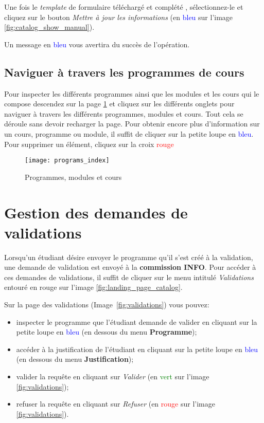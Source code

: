 Une fois le \textit{template} de formulaire téléchargé et complété , sélectionnez-le et cliquez sur le bouton \textit{Mettre à jour les informations} (en \textcolor{blue}{bleu} sur l'image \ref{fig:catalog_show_manual}).


Un message en \textcolor{blue}{bleu} vous avertira du succès de l'opération.


\subsection{Naviguer à travers les programmes de cours}

Pour inspecter les différents programmes ainsi que les modules et les cours qui le compose descendez sur la page \ref{fig:programs_index} et cliquez sur les différents onglets pour naviguer à travers les différents programmes, modules et cours. Tout cela se déroule sans devoir recharger la page. Pour obtenir encore plus d'information sur un cours, programme ou module, il suffit de cliquer sur la petite loupe en \textcolor{blue}{bleu}. Pour supprimer un élément, cliquez sur la croix \textcolor{red}{rouge}

\begin{figure}[htb]
\centering
\caption{Programmes, modules et cours}
\label{fig:programs_index}
\texttt{[image: programs\_index]}

\end{figure}



\section{Gestion des demandes de validations}
Lorsqu'un étudiant désire envoyer le programme qu'il s'est créé à la validation, une demande de validation est envoyé à la \textbf{commission INFO}. Pour accéder à ces demandes de validations, 
il suffit de cliquer sur le menu intitulé \textit{Validations} entouré en rouge sur l'image \ref{fig:landing_page_catalog}.

Sur la page des validations (Image~\ref{fig:validations}) vous pouvez:
\begin{itemize}
\item inspecter le programme que l'étudiant demande de valider en cliquant sur la petite loupe en \textcolor{blue}{bleu} (en dessous du menu \textbf{Programme});
\item accéder à la justification de l'étudiant en cliquant sur la petite loupe en \textcolor{blue}{bleu} (en dessous du menu \textbf{Justification});
\item valider la requête en cliquant sur \textit{Valider} (en \textcolor{green}{vert} sur l'image \ref{fig:validations});
\item refuser la requête en cliquant sur \textit{Refuser} (en \textcolor{red}{rouge} sur l'image \ref{fig:validations}).
\end{itemize}

